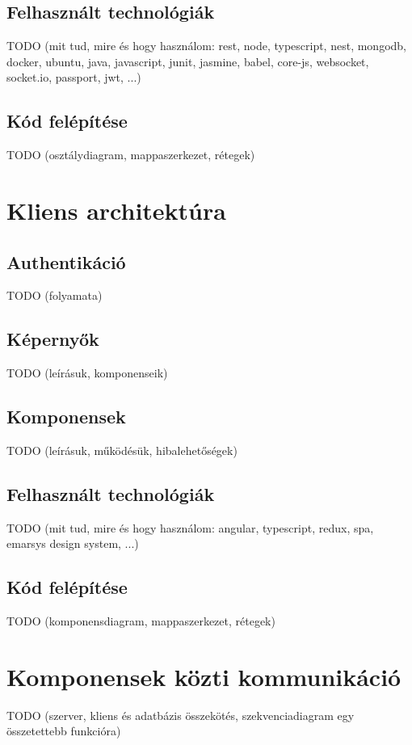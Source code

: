 \documentclass{elteikthesis}
\begin{document}
			\subsection{Felhasznált technológiák}
			TODO (mit tud, mire és hogy használom: rest, node, typescript, nest, mongodb, docker, ubuntu, java, javascript, junit, jasmine, babel, core-js, websocket, socket.io, passport, jwt, ...)
			
			\subsection{Kód felépítése}
			TODO (osztálydiagram, mappaszerkezet, rétegek)
		
		\section{Kliens architektúra}

			\subsection{Authentikáció}
			TODO (folyamata)
			
			\subsection{Képernyők}
			TODO (leírásuk, komponenseik)
			
			\subsection{Komponensek}
			TODO (leírásuk, működésük, hibalehetőségek)
			
			\subsection{Felhasznált technológiák}
			TODO (mit tud, mire és hogy használom: angular, typescript, redux, spa, emarsys design system, ...)
			
			\subsection{Kód felépítése}
			TODO (komponensdiagram, mappaszerkezet, rétegek)
		
		\section{Komponensek közti kommunikáció}
		TODO (szerver, kliens és adatbázis összekötés, szekvenciadiagram egy összetettebb funkcióra)
\end{document}
